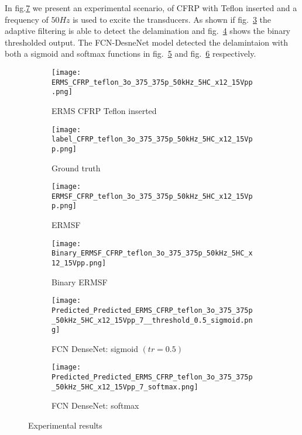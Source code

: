 	In fig.\ref{fig:Exp_ERMS_teflon} we present an experimental scenario, of CFRP with Teflon inserted and a frequency of \(50 Hz\) is used to excite the transducers.
	As shown if fig.~\ref{fig:ERMSF_CFRP_teflon} the adaptive filtering is able to detect the delamination and fig.~\ref{fig:Binary_ERMSF_CFRP} shows the binary thresholded output. 
	The FCN-DesneNet model detected the delamintaion with both a sigmoid and softmax functions in fig.~\ref{fig:EXP_predict_sigmoid} and fig.~\ref{fig:EXP_predict_softmax} respectively.
	\begin{figure} [h!]
		\centering
		\begin{subfigure}[b]{0.47\textwidth}
			\centering
			\texttt{[image: ERMS\_CFRP\_teflon\_3o\_375\_375p\_50kHz\_5HC\_x12\_15Vpp.png]}
			\caption{ERMS CFRP Teflon inserted}
			\label{fig:Delamination}
		\end{subfigure}			
		\hfill
		\begin{subfigure}[b]{0.47\textwidth}
			\centering 	
			\texttt{[image: label\_CFRP\_teflon\_3o\_375\_375p\_50kHz\_5HC\_x12\_15Vpp.png]}
			\caption{Ground truth} 
			\label{fig:damage_label}
		\end{subfigure}
		\hfill
		\begin{subfigure}[b]{0.47\textwidth}
			\centering
			\texttt{[image: ERMSF\_CFRP\_teflon\_3o\_375\_375p\_50kHz\_5HC\_x12\_15Vpp.png]}
			\caption{ERMSF} 
			\label{fig:ERMSF_CFRP_teflon}
		\end{subfigure}
		\hfill
		\begin{subfigure}[b]{0.47\textwidth}
		\centering
		\texttt{[image: Binary\_ERMSF\_CFRP\_teflon\_3o\_375\_375p\_50kHz\_5HC\_x12\_15Vpp.png]}
		\caption{Binary ERMSF} 
		\label{fig:Binary_ERMSF_CFRP}
		\end{subfigure}
		\hfill
		\begin{subfigure}[b]{0.47\textwidth}
			\centering
			\texttt{[image: Predicted\_Predicted\_ERMS\_CFRP\_teflon\_3o\_375\_375p\_50kHz\_5HC\_x12\_15Vpp\_7\_\_threshold\_0.5\_sigmoid.png]}
			\caption{FCN DenseNet: sigmoid \((tr = 0.5)\)} 
			\label{fig:EXP_predict_sigmoid}
		\end{subfigure}
		\hfill
		\begin{subfigure}[b]{0.47\textwidth}
			\centering
			\texttt{[image: Predicted\_Predicted\_ERMS\_CFRP\_teflon\_3o\_375\_375p\_50kHz\_5HC\_x12\_15Vpp\_7\_softmax.png]}
			\caption{FCN DenseNet: softmax} 
			\label{fig:EXP_predict_softmax}
		\end{subfigure}
			\caption{Experimental results}
			\label{fig:Exp_ERMS_teflon}
		\end{figure}
	
